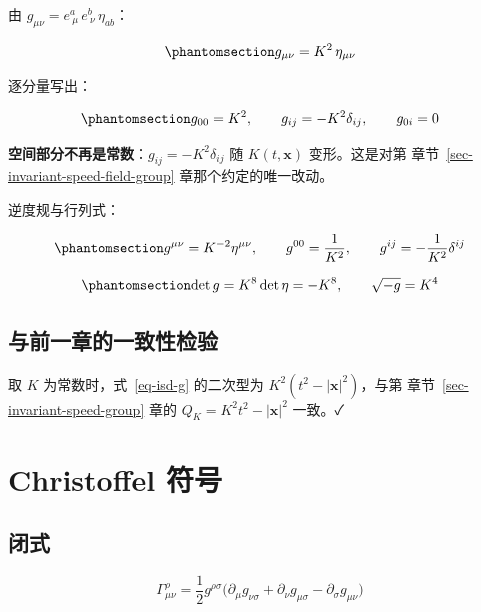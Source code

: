 \documentclass[
  chinese,
  a4paper,
  UTF8,
  12pt,
  oneside,
  openany]{ctexbook}
\theoremstyle{plain}
\theoremstyle{plain}
\theoremstyle{plain}
\theoremstyle{definition}
\theoremstyle{plain}
\theoremstyle{plain}
\theoremstyle{remark}
\begin{document}
由 \(g_{\mu\nu}=e^{a}_{\ \mu}\,e^{b}_{\ \nu}\,\eta_{ab}\)：

\begin{equation}\protect\phantomsection\label{eq-isd-g}{
g_{\mu\nu}=K^{2}\,\eta_{\mu\nu}
}\end{equation}

逐分量写出：

\begin{equation}\protect\phantomsection\label{eq-isd-g-comp}{
g_{00}=K^{2},\qquad g_{ij}=-K^{2}\delta_{ij},\qquad g_{0i}=0
}\end{equation}

\textbf{空间部分不再是常数}：\(g_{ij}=-K^{2}\delta_{ij}\) 随
\(K(t,\mathbf{x})\) 变形。这是对第
章节~\ref{sec-invariant-speed-field-group} 章那个约定的唯一改动。

逆度规与行列式：

\begin{equation}\protect\phantomsection\label{eq-isd-ginv}{
g^{\mu\nu}=K^{-2}\eta^{\mu\nu},\qquad
g^{00}=\frac{1}{K^{2}},\qquad g^{ij}=-\frac{1}{K^{2}}\delta^{ij}
}\end{equation}

\begin{equation}\protect\phantomsection\label{eq-isd-det}{
\det g=K^{8}\det\eta=-K^{8},\qquad \sqrt{-g}=K^{4}
}\end{equation}

\subsection{与前一章的一致性检验}\label{ux4e0eux524dux4e00ux7ae0ux7684ux4e00ux81f4ux6027ux68c0ux9a8c}

取 \(K\) 为常数时，式~\ref{eq-isd-g} 的二次型为
\(K^{2}(t^{2}-\lvert\mathbf{x}\rvert^{2})\)，与第
章节~\ref{sec-invariant-speed-group} 章的
\(Q_K=K^{2}t^{2}-\lvert\mathbf{x}\rvert^{2}\) 一致。✓

\section{Christoffel 符号}\label{sec-isd-christoffel}

\subsection{闭式}\label{ux95edux5f0f}

\[
\Gamma^{\rho}_{\mu\nu}=\frac{1}{2}g^{\rho\sigma}
\bigl(\partial_\mu g_{\nu\sigma}+\partial_\nu g_{\mu\sigma}-\partial_\sigma g_{\mu\nu}\bigr)
\]
\end{document}
